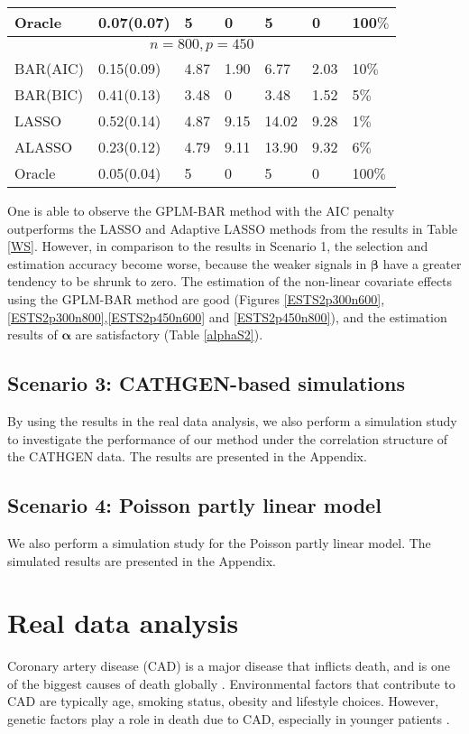 \documentclass[11pt]{article}
\begin{document}
\begin{table}
\begin{tabular}{l|llllll}
Oracle & 0.07(0.07) & 5 & 0 & 5 & 0 & 100$\%$ \\
\hline
\multicolumn{7}{c}{$n=800,p=450$} \\
\hline
BAR(AIC) & 0.15(0.09) & 4.87 & 1.90 & 6.77 & 2.03 & 10$\%$  \\
BAR(BIC) & 0.41(0.13) & 3.48 & 0 & 3.48 & 1.52 & 5$\%$ \\
LASSO& 0.52(0.14) & 4.87 & 9.15 & 14.02 & 9.28 & 1$\%$  \\
ALASSO & 0.23(0.12) & 4.79 & 9.11 & 13.90 & 9.32 & 6$\%$  \\ 
Oracle & 0.05(0.04) & 5 & 0 & 5 & 0 & 100$\%$ \\
\hline
\end{tabular}
\end{table}
One is able to observe the GPLM-BAR method with the AIC penalty outperforms the LASSO and Adaptive LASSO methods from the results in Table \ref{WS}. However, in comparison to the results in Scenario 1, the selection and estimation accuracy become worse, because the weaker signals in $\boldsymbol{\beta}$ have a greater tendency to be shrunk to zero. The estimation of the non-linear covariate effects using the GPLM-BAR method are good (Figures \ref{ESTS2p300n600},\ref{ESTS2p300n800},\ref{ESTS2p450n600} and \ref{ESTS2p450n800}), and the estimation results of $\boldsymbol{\alpha}$ are satisfactory (Table \ref{alphaS2}).

\subsection*{Scenario 3: CATHGEN-based simulations}

By using the results in the real data analysis, we also perform a simulation study to investigate the performance of our method under the correlation structure of the CATHGEN data. The results are presented in the Appendix.

\subsection*{Scenario 4: Poisson partly linear model}

We also perform a simulation study for the Poisson partly linear model. The simulated results are presented in the Appendix. 

\section{Real data analysis} \label{rda}
Coronary artery disease (CAD) is a major disease that inflicts death, and is one of the biggest causes of death globally \citep{abubakar2015global}. Environmental factors that contribute to CAD are typically age, smoking status, obesity and lifestyle choices. However, genetic factors play a role in death due to CAD, especially in younger patients \citep{marenberg1994genetic}. 
\end{document}
